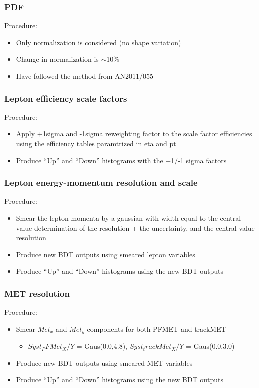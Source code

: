\subsubsection{PDF}
Procedure:
  \begin{itemize}
    \item Only normalization is considered (no shape variation)
    \item Change in normalization is $\sim$10\%
    \item Have followed the method from AN2011/055
  \end{itemize}

\subsubsection{Lepton efficiency scale factors}
Procedure:
  \begin{itemize}
    \item Apply +1sigma and -1sigma reweighting factor to the scale factor efficiencies using the efficiency tables paramtrized in eta and pt
    \item Produce ``Up'' and ``Down'' histograms with the +1/-1 sigma factors
  \end{itemize}

\subsubsection{Lepton energy-momentum resolution and scale}

Procedure:
  \begin{itemize}
    \item Smear the lepton momenta by a gaussian with width equal to the central value determination of the resolution + the uncertainty, and the central value resolution
    \item Produce new BDT outputs using smeared lepton variables
    \item Produce ``Up'' and ``Down'' histograms using the new BDT outputs
  \end{itemize}

\subsubsection{MET resolution}
Procedure:
  \begin{itemize}
    \item Smear $Met_x$ and $Met_y$ components for both PFMET and trackMET
      \begin{itemize}
      \item $Syst_PFMet_X/Y$ = Gaus(0.0,4.8), $Syst_trackMet_X/Y$ = Gaus(0.0,3.0)
      \end{itemize}    
    \item Produce new BDT outputs using smeared MET variables
    \item Produce ``Up'' and ``Down'' histograms using the new BDT outputs
  \end{itemize}

